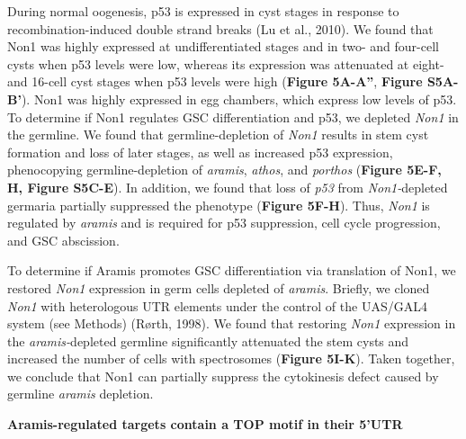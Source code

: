 \documentclass[12pt,twoside]{reedthesis}
\begin{document}
During normal oogenesis, p53 is expressed in cyst stages in response to
recombination-induced double strand breaks
(Lu et al., 2010). We found that Non1 was highly
expressed at undifferentiated stages and in two- and four-cell cysts
when p53 levels were low, whereas its expression was attenuated at
eight- and 16-cell cyst stages when p53 levels were high (\textbf{Figure
5A-A''}, \textbf{Figure S5A-B'}). Non1 was highly expressed in egg chambers,
which express low levels of p53. To determine if Non1 regulates GSC
differentiation and p53, we depleted \emph{Non1} in the germline. We found
that germline-depletion of \emph{Non1} results in stem cyst formation and
loss of later stages, as well as increased p53 expression, phenocopying
germline-depletion of \emph{aramis}, \emph{athos}, and \emph{porthos} (\textbf{Figure 5E-F,
H, Figure S5C-E}). In addition, we found that loss of \emph{p53} from
\emph{Non1-}depleted germaria partially suppressed the phenotype (\textbf{Figure
5F-H}). Thus, \emph{Non1} is regulated by \emph{aramis} and is required for p53
suppression, cell cycle progression, and GSC abscission.

To determine if Aramis promotes GSC differentiation via translation of
Non1, we restored \emph{Non1} expression in germ cells depleted of \emph{aramis}.
Briefly, we cloned \emph{Non1} with heterologous UTR elements under the
control of the UAS/GAL4 system (see Methods)
(Rørth, 1998). We found that restoring \emph{Non1}
expression in the \emph{aramis-}depleted germline significantly attenuated
the stem cysts and increased the number of cells with spectrosomes
(\textbf{Figure 5I-K}). Taken together, we conclude that Non1 can partially
suppress the cytokinesis defect caused by germline \emph{aramis} depletion.

\textbf{Aramis-regulated targets contain a TOP motif in their 5'UTR}
\end{document}
